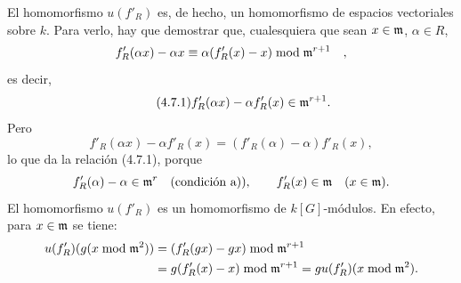 El homomorfismo $u(f'_R)$ es, de hecho, un homomorfismo de espacios vectoriales sobre $k$. Para verlo, hay que demostrar que, cualesquiera que sean $x \in \mathfrak m$, $\alpha \in R$,
\[
f'_R(\alpha x) - \alpha x \equiv \alpha(f'_R(x) - x) \bmod \mathfrak m^{r+1} \quad ,
\]
es decir,
\begin{equation}
\tag{4.7.1}
f'_R(\alpha x)-\alpha f'_R(x)\in\mathfrak m^{r+1}.
\end{equation}
Pero
\[
f'_R(\alpha x)-\alpha f'_R(x)=(f'_R(\alpha)-\alpha)f'_R(x),
\]
lo que da la relación (4.7.1), porque
\[
f'_R(\alpha)-\alpha\in\mathfrak m^r\quad\hbox{(condición a))},
\qquad
f'_R(x)\in\mathfrak m\quad (x\in\mathfrak m).
\]
El homomorfismo $u(f'_R)$ es un homomorfismo de $k[G]$-módulos. En efecto, para $x\in\mathfrak m$ se tiene:
\[
\begin{aligned}
u(f'_R)(g(x\bmod\mathfrak m^2))
&=(f'_R(gx)-gx)\bmod\mathfrak m^{r+1}\\
&=g(f'_R(x)-x)\bmod\mathfrak m^{r+1}
=gu(f'_R)(x\bmod\mathfrak m^2).
\end{aligned}
\]
